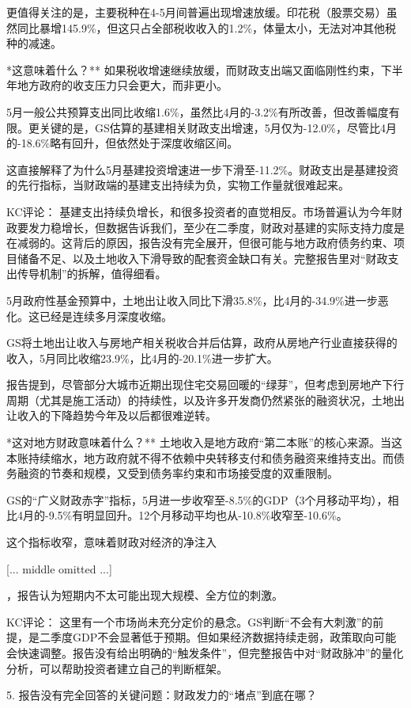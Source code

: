 \documentclass[11pt]{ctexart}
\begin{document}
更值得关注的是，主要税种在4-5月间普遍出现增速放缓。印花税（股票交易）虽然同比暴增145.9\%，但这只占全部税收收入的1.2\%，体量太小，无法对冲其他税种的减速。

*这意味着什么？** 如果税收增速继续放缓，而财政支出端又面临刚性约束，下半年地方政府的收支压力只会更大，而非更小。

5月一般公共预算支出同比收缩1.6\%，虽然比4月的-3.2\%有所改善，但改善幅度有限。更关键的是，GS估算的基建相关财政支出增速，5月仅为-12.0\%，尽管比4月的-18.6\%略有回升，但依然处于深度收缩区间。

这直接解释了为什么5月基建投资增速进一步下滑至-11.2\%。财政支出是基建投资的先行指标，当财政端的基建支出持续为负，实物工作量就很难起来。

KC评论： 基建支出持续负增长，和很多投资者的直觉相反。市场普遍认为今年财政要发力稳增长，但数据告诉我们，至少在二季度，财政对基建的实际支持力度是在减弱的。这背后的原因，报告没有完全展开，但很可能与地方政府债务约束、项目储备不足、以及土地收入下滑导致的配套资金缺口有关。完整报告里对“财政支出传导机制”的拆解，值得细看。

5月政府性基金预算中，土地出让收入同比下滑35.8\%，比4月的-34.9\%进一步恶化。这已经是连续多月深度收缩。

GS将土地出让收入与房地产相关税收合并后估算，政府从房地产行业直接获得的收入，5月同比收缩23.9\%，比4月的-20.1\%进一步扩大。

报告提到，尽管部分大城市近期出现住宅交易回暖的“绿芽”，但考虑到房地产下行周期（尤其是施工活动）的持续性，以及许多开发商仍然紧张的融资状况，土地出让收入的下降趋势今年及以后都很难逆转。

*这对地方财政意味着什么？** 土地收入是地方政府“第二本账”的核心来源。当这本账持续缩水，地方政府就不得不依赖中央转移支付和债务融资来维持支出。而债务融资的节奏和规模，又受到债务率约束和市场接受度的双重限制。

GS的“广义财政赤字”指标，5月进一步收窄至-8.5\%的GDP（3个月移动平均），相比4月的-9.5\%有明显回升。12个月移动平均也从-10.8\%收窄至-10.6\%。

这个指标收窄，意味着财政对经济的净注入

[... middle omitted ...]

，报告认为短期内不太可能出现大规模、全方位的刺激。

KC评论： 这里有一个市场尚未充分定价的悬念。GS判断“不会有大刺激”的前提，是二季度GDP不会显著低于预期。但如果经济数据持续走弱，政策取向可能会快速调整。报告没有给出明确的“触发条件”，但完整报告中对“财政脉冲”的量化分析，可以帮助投资者建立自己的判断框架。

5. 报告没有完全回答的关键问题：财政发力的“堵点”到底在哪？
\end{document}
